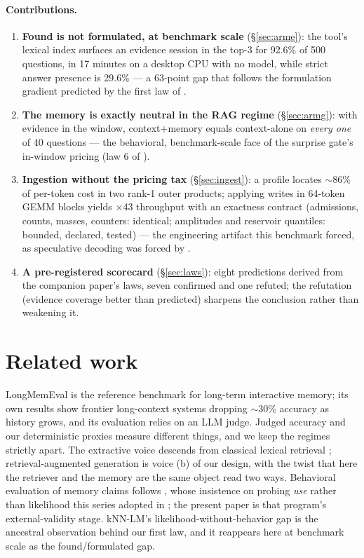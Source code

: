 \documentclass[11pt]{article}
\begin{document}
\paragraph{Contributions.}
\begin{enumerate}[leftmargin=1.5em,itemsep=2pt]
\item \textbf{Found is not formulated, at benchmark scale} (\S\ref{sec:arme}): the tool's lexical index surfaces an evidence session in the top-3 for 92.6\% of 500 questions, in 17 minutes on a desktop CPU with no model, while strict answer presence is 29.6\% --- a 63-point gap that follows the formulation gradient predicted by the first law of \cite{behavior}.
\item \textbf{The memory is exactly neutral in the RAG regime} (\S\ref{sec:armg}): with evidence in the window, context+memory equals context-alone on \emph{every one} of 40 questions --- the behavioral, benchmark-scale face of the surprise gate's in-window pricing (law 6 of \cite{behavior}).
\item \textbf{Ingestion without the pricing tax} (\S\ref{sec:ingest}): a profile locates $\sim$86\% of per-token cost in two rank-1 outer products; applying writes in 64-token GEMM blocks yields $\times$43 throughput with an exactness contract (admissions, counts, masses, counters: identical; amplitudes and reservoir quantiles: bounded, declared, tested) --- the engineering artifact this benchmark forced, as speculative decoding was forced by \cite{drafter}.
\item \textbf{A pre-registered scorecard} (\S\ref{sec:laws}): eight predictions derived from the companion paper's laws, seven confirmed and one refuted; the refutation (evidence coverage better than predicted) sharpens the conclusion rather than weakening it.
\end{enumerate}

\section{Related work}

LongMemEval \cite{longmemeval} is the reference benchmark for long-term interactive memory; its own results show frontier long-context systems dropping $\sim$30\% accuracy as history grows, and its evaluation relies on an LLM judge. Judged accuracy and our deterministic proxies measure different things, and we keep the regimes strictly apart. The extractive voice descends from classical lexical retrieval \cite{bm25}; retrieval-augmented generation \cite{rag} is voice (b) of our design, with the twist that here the retriever and the memory are the same object read two ways. Behavioral evaluation of memory claims follows \cite{beyondppl}, whose insistence on probing \emph{use} rather than likelihood this series adopted in \cite{behavior}; the present paper is that program's external-validity stage. kNN-LM's likelihood-without-behavior gap \cite{khandelwal2020} is the ancestral observation behind our first law, and it reappears here at benchmark scale as the found/formulated gap.
\end{document}
